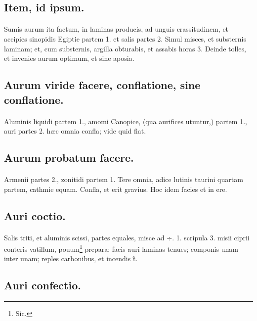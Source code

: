 \documentclass[a4paper, 11pt, oneside, polutonikogreek, italian]{article}
\begin{document}
\subsection{Item, id ipsum.}
\paragraph{}
Sumis aurum ita factum, in laminas producis, ad unguis crassitudinem, et accipies sinopidis Egiptie partem 1. et salis partes 2. Simul misces, et substernis laminam; et, cum substernis, argilla obturabis, et assabis horas 3. Deinde tolles, et invenies aurum optimum, et sine aposia.

\subsection{Aurum viride facere, conflatione, sine conflatione.}
\paragraph{}
Aluminis liquidi partem 1., amomi Canopice, (qua aurifices utuntur,) partem 1., auri partes 2. hæc omnia confla; vide quid fiat.

\subsection{Aurum probatum facere.}
\paragraph{}
Armenii partes 2., zonitidi partem 1. Tere omnia, adice lutinis taurini quartam partem, cathmie equam. Confla, et erit gravius. Hoc idem facies et in ere.

\subsection{Auri coctio.}
\paragraph{}
Salis triti, et aluminis scissi, partes equales, misce ad $\div$. 1. scripula 3. misii ciprii conteris vatillum, pouum\footnote{Sic.} prepara; facis auri laminas tenues; componis unam inter unam; reples carbonibus, et incendis \~{t}.

\subsection{Auri confectio.}
\end{document}
